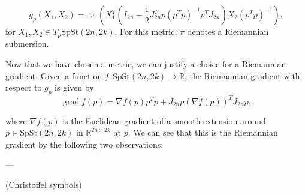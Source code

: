 \begin{equation}\label{eq:spst_metric}
    g_{p}(X_{1},X_{2})=\operatorname{tr}\left(X_{1}^{T}\left(I_{2n}- \frac{1}{2}J_{2n}^{T}p(p^{T}p)^{-1}p^{T}J_{2n}\right)X_{2}(p^{T}p)^{-1}\right),
\end{equation}
for $X_{1},X_{2}\in T_{p}\mathrm{SpSt}(2n, 2k)$. For this metric, $\pi$ denotes a Riemannian submersion.

Now that we have chosen a metric, we can justify a choice for a Riemannian gradient. Given a function $f:\mathrm{SpSt}(2n, 2k)\xrightarrow{}\mathbb{R}$, the Riemannian gradient with respect to $g_{p}$ is given by
\begin{equation}\label{eq:rie_grad}
    \operatorname{grad}f(p)=\nabla f(p)p^{T}p+J_{2n}p(\nabla f(p))^{T}J_{2n}p,
\end{equation}

where $\nabla f(p)$ is the Euclidean gradient of a smooth extension around $p\in \mathrm{SpSt}(2n, 2k)$ in $\mathbb{R}^{2n\times2k}$ at $p$. We can see that this is the Riemannian gradient by the following two observations:  

---

(Christoffel symbols)

